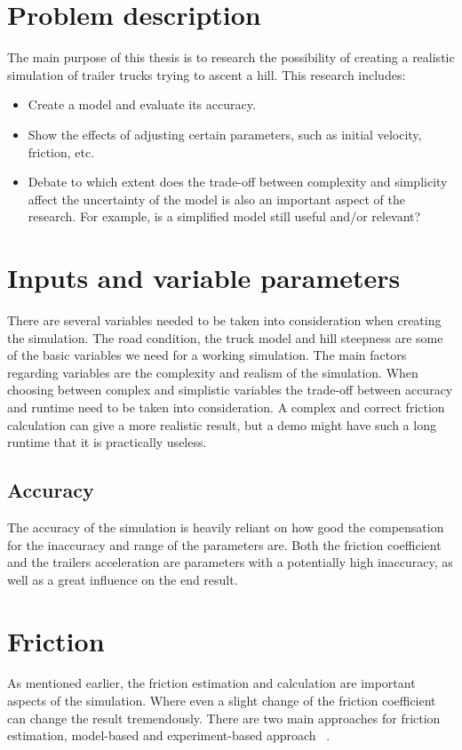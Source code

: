 \documentclass[noprint]{uit-thesis}
\begin{document}
\section{Problem description}
The main purpose of this thesis is to research the possibility of creating a realistic simulation of trailer trucks trying to ascent a hill. This research includes: 
\begin{itemize}
\setlength\itemsep{-0.3cm}
\item Create a model and evaluate its accuracy.
\item Show the effects of adjusting certain parameters, such as initial velocity, friction, etc. 
\item Debate to which extent does the trade-off between complexity and simplicity affect the uncertainty of the model is also an important aspect of the research. For example, is a simplified model still useful and/or relevant?
\end{itemize}


\section{Inputs and variable parameters}
There are several variables needed to be taken into consideration when creating the simulation. The road condition, the truck model and hill steepness are some of the basic variables we need for a working simulation. The main factors regarding variables are the complexity and realism of the simulation. When choosing between complex and simplistic variables the trade-off between accuracy and runtime need to be taken into consideration. A complex and correct friction calculation can give a more realistic result, but a demo might have such a long runtime that it is practically useless. 

\subsection{Accuracy}
The accuracy of the simulation is heavily reliant on how good the compensation for the inaccuracy and range of the parameters are. Both the friction coefficient and the trailers acceleration are parameters with a potentially high inaccuracy, as well as a great influence on the end result. 

\section{Friction} 
As mentioned earlier, the friction estimation and calculation are important aspects of the simulation. Where even a slight change of the friction coefficient can change the result tremendously. There are two main approaches for friction estimation, model-based and experiment-based approach ~\citep{frictionEstimation}. 
\end{document}
